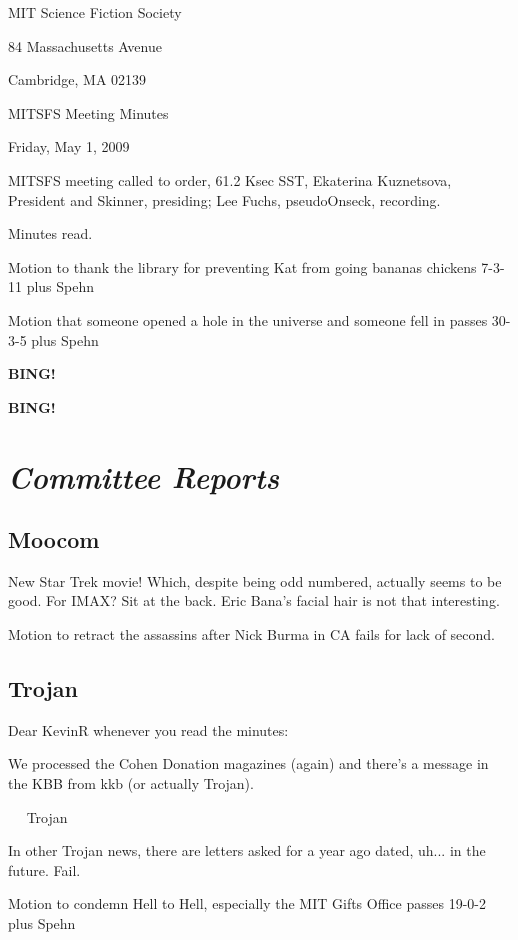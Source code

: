 \documentclass[10pt]{article}
\newcommand{\bing}{{\bf BING!} }
\newcommand{\goto}[1]{\bing \vskip 12pt \section*{{\em{#1}}}}
\newcommand{\ps}{ plus Spehn\xspace}
\begin{document}
\begin{center}

MIT Science Fiction Society

84 Massachusetts Avenue

Cambridge, MA 02139

\vspace{12pt}

MITSFS Meeting Minutes

Friday, May 1, 2009

\end{center}

\vspace{18pt}

\setlength{\parskip}{6pt}

\noindent
MITSFS meeting called to order, 61.2 Ksec SST,
Ekaterina Kuznetsova, President and Skinner, presiding; Lee Fuchs, pseudoOnseck, recording.

Minutes read.

Motion to thank the library for preventing Kat from going bananas  chickens 7-3-11 \ps

Motion that someone opened a hole in the universe and someone fell in passes 30-3-5 \ps

\bing

\goto{Committee Reports}

\subsection*{Moocom}
New Star Trek movie! Which, despite being odd numbered, actually seems to be good. For
IMAX? Sit at the back.  Eric Bana's facial hair is not that interesting.

Motion to retract the assassins after Nick Burma in CA fails for lack of second.

\subsection*{Trojan}
Dear KevinR whenever you read the minutes:

We processed the Cohen Donation magazines (again) and there's a message in the KBB from
kkb (or actually Trojan).

~~ Trojan

In other Trojan news, there are letters asked for a year ago dated, uh... in the future.
Fail.

Motion to condemn Hell to Hell, especially the MIT Gifts Office passes 19-0-2 \ps
\end{document}
